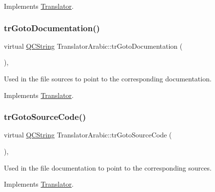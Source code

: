 Implements \mbox{\hyperlink{class_translator}{Translator}}.

\mbox{\label{class_translator_arabic_a80b353827c8c85f04426634456b44c65}} 
\subsubsection{\texorpdfstring{trGotoDocumentation()}{trGotoDocumentation()}}
{\footnotesize\ttfamily virtual \mbox{\hyperlink{class_q_c_string}{Q\+C\+String}} Translator\+Arabic\+::tr\+Goto\+Documentation (\begin{DoxyParamCaption}{ }\end{DoxyParamCaption})\hspace{0.3cm}{\ttfamily [inline]}, {\ttfamily [virtual]}}

Used in the file sources to point to the corresponding documentation. 

Implements \mbox{\hyperlink{class_translator}{Translator}}.

\mbox{\label{class_translator_arabic_af6dd093850dd0c255d7421b6063d79ca}} 
\subsubsection{\texorpdfstring{trGotoSourceCode()}{trGotoSourceCode()}}
{\footnotesize\ttfamily virtual \mbox{\hyperlink{class_q_c_string}{Q\+C\+String}} Translator\+Arabic\+::tr\+Goto\+Source\+Code (\begin{DoxyParamCaption}{ }\end{DoxyParamCaption})\hspace{0.3cm}{\ttfamily [inline]}, {\ttfamily [virtual]}}

Used in the file documentation to point to the corresponding sources. 

Implements \mbox{\hyperlink{class_translator}{Translator}}.

\mbox{\label{class_translator_arabic_a0e846c5779242ca184c0eba9e939be4c}} 
